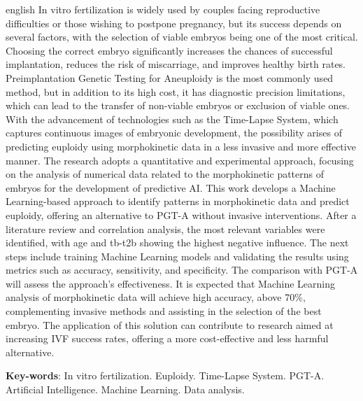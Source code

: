 \begin{resumo}[Abstract]
 \begin{otherlanguage*}{english}
    In vitro fertilization is widely used by couples facing reproductive difficulties or those wishing to postpone pregnancy, but its success depends on several factors, with the selection of viable embryos being one of the most critical. Choosing the correct embryo significantly increases the chances of successful implantation, reduces the risk of miscarriage, and improves healthy birth rates. Preimplantation Genetic Testing for Aneuploidy is the most commonly used method, but in addition to its high cost, it has diagnostic precision limitations, which can lead to the transfer of non-viable embryos or exclusion of viable ones. With the advancement of technologies such as the Time-Lapse System, which captures continuous images of embryonic development, the possibility arises of predicting euploidy using morphokinetic data in a less invasive and more effective manner. The research adopts a quantitative and experimental approach, focusing on the analysis of numerical data related to the morphokinetic patterns of embryos for the development of predictive AI. This work develops a Machine Learning-based approach to identify patterns in morphokinetic data and predict euploidy, offering an alternative to PGT-A without invasive interventions. After a literature review and correlation analysis, the most relevant variables were identified, with age and tb-t2b showing the highest negative influence. The next steps include training Machine Learning models and validating the results using metrics such as accuracy, sensitivity, and specificity. The comparison with PGT-A will assess the approach’s effectiveness. It is expected that Machine Learning analysis of morphokinetic data will achieve high accuracy, above 70\%, complementing invasive methods and assisting in the selection of the best embryo. The application of this solution can contribute to research aimed at increasing IVF success rates, offering a more cost-effective and less harmful alternative.
  \vspace{\onelineskip}
 
  \noindent 
  \textbf{Key-words}: In vitro fertilization. Euploidy. Time-Lapse System. PGT-A. Artificial Intelligence. Machine Learning. Data analysis.
 \end{otherlanguage*}
\end{resumo}
